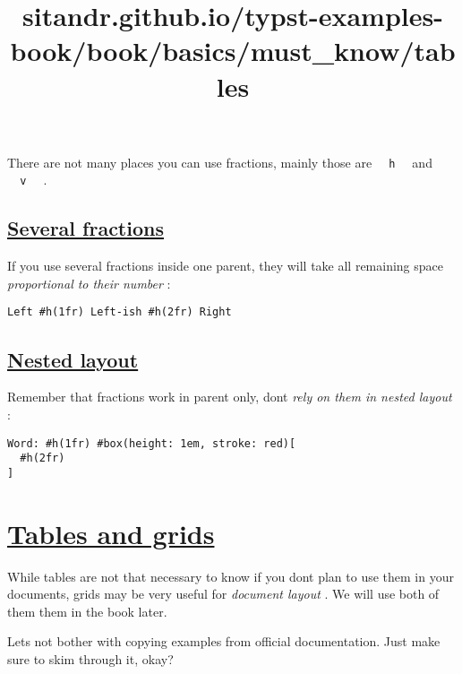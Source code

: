 There are not many places you can use fractions, mainly those are
\texttt{\ }{\texttt{\ h\ }}\texttt{\ } and
\texttt{\ }{\texttt{\ v\ }}\texttt{\ } .

\subsection{\texorpdfstring{\hyperref[several-fractions]{Several
fractions}}{Several fractions}}\label{several-fractions}

If you use several fractions inside one parent, they will take all
remaining space \emph{proportional to their number} :

\begin{verbatim}
Left #h(1fr) Left-ish #h(2fr) Right
\end{verbatim}

\pandocbounded{}

\subsection{\texorpdfstring{\hyperref[nested-layout]{Nested
layout}}{Nested layout}}\label{nested-layout}

Remember that fractions work in parent only, don\textquotesingle t
\emph{rely on them in nested layout} :

\begin{verbatim}
Word: #h(1fr) #box(height: 1em, stroke: red)[
  #h(2fr)
]
\end{verbatim}

\pandocbounded{}


\title{sitandr.github.io/typst-examples-book/book/basics/must_know/tables}

\section{\texorpdfstring{\hyperref[tables-and-grids]{Tables and
grids}}{Tables and grids}}\label{tables-and-grids}

While tables are not that necessary to know if you don\textquotesingle t
plan to use them in your documents, grids may be very useful for
\emph{document layout} . We will use both of them them in the book
later.

Let\textquotesingle s not bother with copying examples from official
documentation. Just make sure to skim through it, okay?

